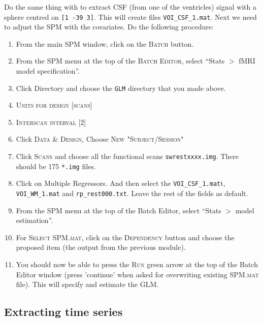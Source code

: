 Do the same thing with to extract CSF (from one of the ventricles) signal with a sphere centred on \texttt{[1 -39 3]}. This will create files \texttt{VOI\_CSF\_1.mat}. Next we need to adjust the SPM with the covariates. Do the following procedure:
\begin{enumerate}
 \item From the main SPM window, click on the \textsc{Batch} button.
 \item From the SPM menu at the top of the \textsc{Batch Editor}, select ``Stats $>$ fMRI model specification''.
 \item Click Directory and choose the \texttt{GLM} directory that you made above.
 \item \textsc{Units for design} [\textsc{scans}]
 \item \textsc{Interscan interval} [2]
 \item Click \textsc{Data \& Design}, Choose \textsc{New "Subject/Session"}
  \item Click \textsc{Scans} and choose all the functional scans \texttt{swrestxxxx.img}. There should be 175 \texttt{*.img} files.
 \item Click on Multiple Regressors. And then select the  \texttt{VOI\_CSF\_1.mat}t, \texttt{VOI\_WM\_1.mat} and \texttt{rp\_rest000.txt}. Leave the rest of the fields as default. 
 \item From the SPM menu at the top of the Batch Editor, select ``Stats $>$ model estimation''.
 \item For \textsc{Select SPM.mat}, click on the \textsc{Dependency} button and choose the proposed item (the output from the previous module).
 \item You should now be able to press the \textsc{Run} green arrow at the top of the Batch Editor window (press 'continue' when asked for overwriting existing \textsc{SPM.mat} file). This will specify and estimate the GLM.
\end{enumerate}

\subsection{Extracting time series}

